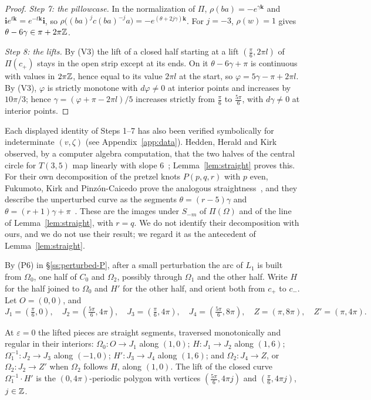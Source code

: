 \begin{proof}
\emph{Step 7: the pillowcase.} In the normalization of $\Pi$, $\rho(ba)=-e^{\gamma\mathbf k}$ and $\mathbf ie^{t\mathbf k}=e^{-t\mathbf k}\mathbf i$, so
$\rho\bigl((ba)^jc(ba)^{-j}a\bigr)=-e^{(\theta+2j\gamma)\mathbf k}$. For $j=-3$, $\rho(w)=1$ gives $\theta-6\gamma\in\pi+2\pi\mathbb{Z}$.

\emph{Step 8: the lifts.} By (V3) the lift of a closed half starting at a lift $(\frac\pi6,2\pi l)$ of $\Pi(c_+)$ stays
in the open strip except at its ends. On it $\theta-6\gamma+\pi$ is continuous with values in $2\pi\mathbb{Z}$, hence equal to its
value $2\pi l$ at the start, so $\varphi=5\gamma-\pi+2\pi l$. By (V3), $\varphi$ is strictly monotone with $d\varphi\neq0$ at interior
points and increases by $10\pi/3$; hence $\gamma=(\varphi+\pi-2\pi l)/5$ increases strictly from $\frac\pi6$ to $\frac{5\pi}6$,
with $d\gamma\neq0$ at interior points.
\end{proof}

Each displayed identity of Steps 1--7 has also been verified symbolically for indeterminate $(v,\zeta)$ (see
Appendix~\ref{app:data}). Hedden, Herald and Kirk observed, by a computer algebra computation, that the two halves of
the central circle for $T(3,5)$ map linearly with slope $6$~\cite[\S11.7, p.~59]{HHK2}; Lemma~\ref{lem:straight} proves
this. For their own decomposition of the pretzel knots $P(p,q,r)$ with $p$ even, Fukumoto, Kirk and Pinz\'on-Caicedo
prove the analogous straightness~\cite[Thm.~5.1]{FKP}, and they describe the unperturbed curve as the segments
$\theta=(r-5)\gamma$ and $\theta=(r+1)\gamma+\pi$~\cite[\S5, p.~28]{FKP}. These are the images under $S_{-m}$ of $\Pi(\Omega)$ and of the line
of Lemma~\ref{lem:straight}, with $r=q$. We do not identify their decomposition with ours, and we do not use their
result; we regard it as the antecedent of Lemma~\ref{lem:straight}.

By (P6) in \S\ref{ss:perturbed-P}, after a small perturbation the arc of $L_1$ is built from $\Omega_0$, one half of
$C_0$ and $\Omega_2$, possibly through $\Omega_1$ and the other half. Write $H$ for the half joined to $\Omega_0$ and $H'$ for the
other half, and orient both from $c_+$ to $c_-$. Let $O=(0,0)$, and
\[
J_1=(\tfrac\pi6,0),\quad J_2=(\tfrac{5\pi}6,4\pi),\quad J_3=(\tfrac\pi6,4\pi),\quad J_4=(\tfrac{5\pi}6,8\pi),\quad Z=(\pi,8\pi),\quad Z'=(\pi,4\pi).
\]

\begin{corollary}\label{cor:polygon}
At $\varepsilon=0$ the lifted pieces are straight segments, traversed monotonically and regular in their interiors:
$\Omega_0\colon O\to J_1$ along $(1,0)$; $H\colon J_1\to J_2$ along $(1,6)$; $\Omega_1^{-1}\colon J_2\to J_3$ along $(-1,0)$;
$H'\colon J_3\to J_4$ along $(1,6)$; and $\Omega_2\colon J_4\to Z$, or $\Omega_2\colon J_2\to Z'$ when $\Omega_2$ follows $H$, along $(1,0)$.
The lift of the closed curve $\Omega_1^{-1}\cdot H'$ is the $(0,4\pi)$-periodic polygon with vertices $(\frac{5\pi}6,4\pi j)$ and
$(\frac\pi6,4\pi j)$, $j\in\mathbb{Z}$.
\end{corollary}

